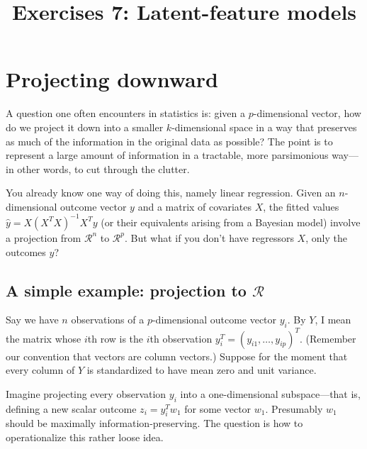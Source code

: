 \documentclass{mynotes}
\title[Exercises 6 $\cdot$ SSC 383D]{Exercises 7: Latent-feature models}
\date{}  %
\begin{document}
\maketitle%


\section{Projecting downward}

A question one often encounters in statistics is: given a $p$-dimensional vector, how do we project it down into a smaller $k$-dimensional space in a way that preserves as much of the information in the original data as possible? The point is to represent a large amount of information in a tractable, more parsimonious way---in other words, to cut through the clutter.

You already know one way of doing this, namely linear regression.  Given an $n$-dimensional outcome vector $y$ and a matrix of covariates $X$, the fitted values $\hat{y} = X (X^T X)^{-1} X^T y$ (or their equivalents arising from a Bayesian model) involve a projection from $\mathcal{R}^n$ to $\mathcal{R}^p$.  But what if you don't have regressors $X$, only the outcomes $y$?

\subsection{A simple example: projection to $\mathcal{R}$}

Say we have $n$ observations of a $p$-dimensional outcome vector $y_i$. By $Y$, I mean the matrix whose $i$th row is the $i$th observation $y_i^T = (y_{i1}, \ldots, y_{ip})^T$.  (Remember our convention that vectors are column vectors.) Suppose for the moment that every column of $Y$ is standardized to have mean zero and unit variance.

Imagine projecting every observation $y_i$ into a one-dimensional subspace---that is, defining a new scalar outcome $z_i = y_i^T w_1$ for some vector $w_1$.  Presumably $w_1$ should be maximally information-preserving.  The question is how to operationalize this rather loose idea.
\end{document}
